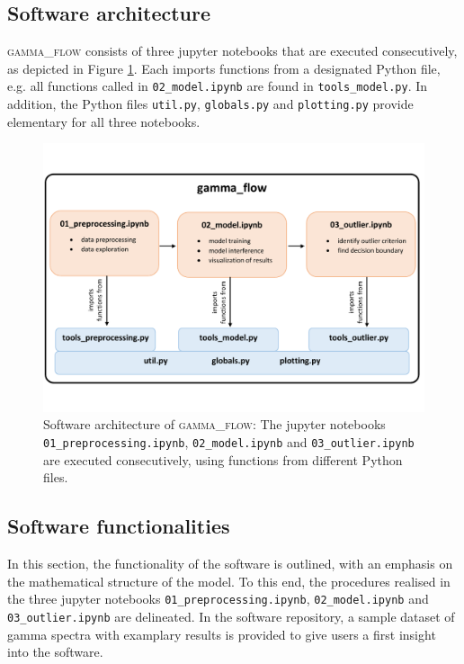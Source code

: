 \documentclass[preprint, 12pt, a4paper]{elsarticle}
\begin{document}
\subsection{Software architecture}
\textsc{gamma\_flow} consists of three jupyter notebooks that are executed consecutively, as depicted in Figure \ref{fig:software_architecture}. Each imports functions from a designated Python file, e.g. all functions called in \texttt{02\_model.ipynb} are found in \texttt{tools\_model.py}. In addition, the Python files \texttt{util.py}, \texttt{globals.py} and \texttt{plotting.py} provide elementary for all three notebooks. 

\begin{figure}[ht]
\includegraphics[width=\textwidth]{software_architecture_gamma_flow.pdf}
\caption{Software architecture of \textsc{gamma\_flow}: The jupyter notebooks \texttt{01\_preprocessing.ipynb}, \texttt{02\_model.ipynb} and \texttt{03\_outlier.ipynb} are executed consecutively, using functions from different Python files. }
\label{fig:software_architecture}
\end{figure}

\subsection{Software functionalities}

In this section, the functionality of the software is outlined, with an emphasis on the mathematical structure of the model. To this end, the procedures realised in the three jupyter notebooks \texttt{01\_preprocessing.ipynb}, \texttt{02\_model.ipynb} and \texttt{03\_outlier.ipynb} are delineated. In the software repository, a sample dataset of gamma spectra with examplary results is provided to give users a first insight into the software. 
\end{document}
